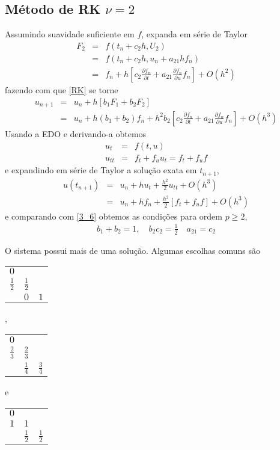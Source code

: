 \subsection{Método de RK $\nu =2$}
Assumindo suavidade suficiente em $f$, expanda em série de Taylor
\begin{eqnarray}
F_2 &=&f(t_n+c_2h,U_2)\\
   &=&f(t_n+c_2h,u_n+ a_{21}h f_n)\\
   &=&f_n +h[c_2 \frac{\partial f_n}{\partial t}+ a_{21} \frac{\partial f_n}{\partial u} f_n]+O(h^2)
\end{eqnarray}
fazendo com que \eqref{RK} se torne
\begin{eqnarray}
  u_{n+1}&=&u_n  + h [ b_1 F_1+b_2F_2] \\
         &=&u_n  + h(b_1+b_2)f_n +h^2b_2[c_2 \frac{\partial f_n}{\partial t}+ a_{21} \frac{\partial f_n}{\partial u} f_n]+O(h^3) \label{3_6}
\end{eqnarray}
Usando a EDO e derivando-a obtemos
\begin{eqnarray}
  u_t    &=&f(t,u)\\
  u_{tt} &=&f_t+f_uu_t = f_t+f_uf
\end{eqnarray}
e expandindo em série de Taylor a solução exata em $t_{n+1}$,
\begin{eqnarray}
  u(t_{n+1})&=&u_n  + hu_t +\frac{h^2}{2}u_{tt} + O(h^3)\\
            &=&u_n  + hf_n +\frac{h^2}{2}[f_t+f_uf]+O(h^3)
\end{eqnarray}
e comparando com \eqref{3_6} obtemos as condições para ordem $p\geq 2$,
\begin{eqnarray}
  b_1+b_2=1, \quad b_2c_2 = \frac{1}{2} \quad a_{21}=c_2
\end{eqnarray}

O sistema possui mais de uma solução. Algumas escolhas comuns são

\begin{tabular}{c|cc}
  $0$ &     &   \\
  $\frac{1}{2}$ & $\frac{1}{2}$ &   \\  \hline
      & $0$ & $1$
\end{tabular},
\begin{tabular}{c|cc}
  $0$ &   &   \\
  $\frac{2}{3}$ & $\frac{2}{3}$ &   \\  \hline
    & $\frac{1}{4}$ & $\frac{3}{4}$
\end{tabular} e
\begin{tabular}{c|cc}
  $0$ &   &   \\
  $1$ & $1$ &   \\  \hline
      & $\frac{1}{2}$ &$\frac{1}{2}$
\end{tabular}

